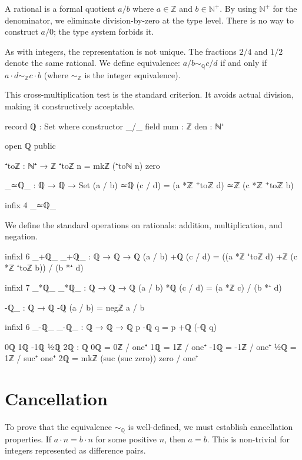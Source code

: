 \documentclass[11pt,a4paper]{book}
\begin{document}
A rational is a formal quotient $a/b$ where $a \in \mathbb{Z}$ and $b \in \mathbb{N}^+$. 
By using $\mathbb{N}^+$ for the denominator, we eliminate division-by-zero at the type level. 
There is no way to construct $a/0$; the type system forbids it.

As with integers, the representation is not unique. The fractions $2/4$ and $1/2$ 
denote the same rational. We define equivalence: $a/b \sim_{\mathbb{Q}} c/d$ if and only if 
$a \cdot d \sim_{\mathbb{Z}} c \cdot b$ (where $\sim_{\mathbb{Z}}$ is the integer equivalence).

This cross-multiplication test is the standard criterion. It avoids actual division, 
making it constructively acceptable.

\begin{code}
record ℚ : Set where
  constructor _/_
  field
    num : ℤ
    den : ℕ⁺

open ℚ public

⁺toℤ : ℕ⁺ → ℤ
⁺toℤ n = mkℤ (⁺toℕ n) zero

_≃ℚ_ : ℚ → ℚ → Set
(a / b) ≃ℚ (c / d) = (a *ℤ ⁺toℤ d) ≃ℤ (c *ℤ ⁺toℤ b)

infix 4 _≃ℚ_
\end{code}

We define the standard operations on rationals: addition, multiplication, and negation.

\begin{code}
infixl 6 _+ℚ_
_+ℚ_ : ℚ → ℚ → ℚ
(a / b) +ℚ (c / d) = ((a *ℤ ⁺toℤ d) +ℤ (c *ℤ ⁺toℤ b)) / (b *⁺ d)

infixl 7 _*ℚ_
_*ℚ_ : ℚ → ℚ → ℚ
(a / b) *ℚ (c / d) = (a *ℤ c) / (b *⁺ d)

-ℚ_ : ℚ → ℚ
-ℚ (a / b) = negℤ a / b

infixl 6 _-ℚ_
_-ℚ_ : ℚ → ℚ → ℚ
p -ℚ q = p +ℚ (-ℚ q)

0ℚ 1ℚ -1ℚ ½ℚ 2ℚ : ℚ
0ℚ  = 0ℤ / one⁺
1ℚ  = 1ℤ / one⁺
-1ℚ = -1ℤ / one⁺
½ℚ  = 1ℤ / suc⁺ one⁺
2ℚ  = mkℤ (suc (suc zero)) zero / one⁺
\end{code}

\section{Cancellation}

To prove that the equivalence $\sim_{\mathbb{Q}}$ is well-defined, we must establish 
cancellation properties. If $a \cdot n = b \cdot n$ for some positive $n$, then $a = b$. 
This is non-trivial for integers represented as difference pairs.
\end{document}
